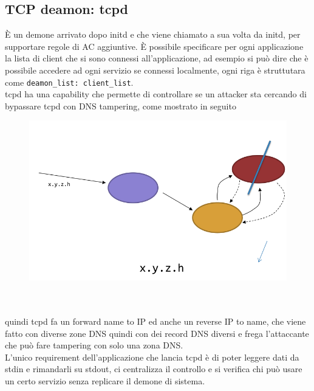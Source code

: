 \documentclass[12pt, oneside]{extbook} %
\begin{document}
\subsection{TCP deamon: tcpd}
È un demone arrivato dopo initd e che viene chiamato a sua volta da initd, per supportare regole di AC aggiuntive. È possibile specificare per ogni applicazione la lista di client che si sono connessi all'applicazione, ad esempio si può dire che è possibile accedere ad ogni servizio se connessi localmente, ogni riga è struttutara come \texttt{deamon\_list: client\_list}.\\tcpd ha una capability che permette di controllare se un attacker sta cercando di bypassare tcpd con DNS tampering, come mostrato in seguito\\
\begin{figure}[!h]
	\includegraphics[scale=0.3]{immagini/tcpd_tampering.png}
\end{figure}\\\\
quindi tcpd fa un forward name to IP ed anche un reverse IP to name, che viene fatto con diverse zone DNS quindi con dei record DNS diversi e frega l'attaccante che può fare tampering con solo una zona DNS.\\L'unico requirement dell'applicazione che lancia tcpd è di poter leggere dati da stdin e rimandarli su stdout, ci centralizza il controllo e si verifica chi può usare un certo servizio senza replicare il demone di sistema.
\end{document}

